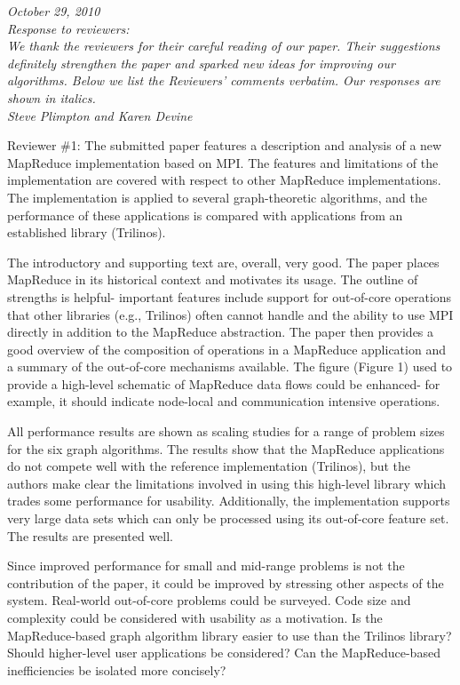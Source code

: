 \documentclass[11pt]{article}
\begin{document}
{\it
October 29, 2010\\
Response to reviewers:  \\
We thank the reviewers for their careful reading of our paper.
Their suggestions definitely strengthen the paper and sparked new ideas
for improving our algorithms.
Below we list the Reviewers' comments verbatim.
Our responses are shown in italics. \\
Steve Plimpton and 
Karen Devine
}

\vspace{0.5 in}

Reviewer \#1: The submitted paper features a description and analysis of a
new MapReduce implementation based on MPI.  The features and limitations
of the implementation are covered with respect to other MapReduce
implementations.  The implementation is applied to several
graph-theoretic algorithms, and the performance of these applications
is compared with applications from an established library (Trilinos).

The introductory and supporting text are, overall, very good.  The
paper places MapReduce in its historical context and motivates its
usage.  The outline of strengths is helpful- important features
include support for out-of-core operations that other libraries (e.g.,
Trilinos) often cannot handle and the ability to use MPI directly in
addition to the MapReduce abstraction.  The paper then provides a good
overview of the composition of operations in a MapReduce application
and a summary of the out-of-core mechanisms available.  The figure
(Figure 1) used to provide a high-level schematic of MapReduce data
flows could be enhanced- for example, it should indicate node-local
and communication intensive operations.

All performance results are shown as scaling studies for a range of
problem sizes for the six graph algorithms.  The results show that the
MapReduce applications do not compete well with the reference
implementation (Trilinos), but the authors make clear the limitations
involved in using this high-level library which trades some
performance for usability.  Additionally, the implementation supports
very large data sets which can only be processed using its out-of-core
feature set.  The results are presented well.

Since improved performance for small and mid-range problems is not the
contribution of the paper, it could be improved by stressing other
aspects of the system.  Real-world out-of-core problems could be
surveyed.  Code size and complexity could be considered with usability
as a motivation.  Is the MapReduce-based graph algorithm library
easier to use than the Trilinos library?  Should higher-level user
applications be considered?  Can the MapReduce-based inefficiencies be
isolated more concisely?
\end{document}
